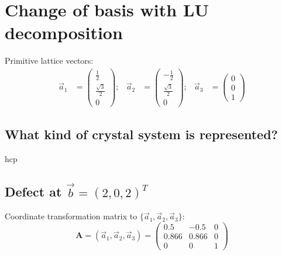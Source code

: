 \section{Change of basis with LU decomposition}

Primitive lattice vectors:
\begin{align}
    \vec{a}_1 &= 
    \begin{pmatrix}
        \frac{1}{2} \\[2pt] \frac{\sqrt{3}}{2} \\[2pt] 0
    \end{pmatrix};
    &
    \vec{a}_2 &=
    \begin{pmatrix}
        -\frac{1}{2} \\[2pt] \frac{\sqrt{3}}{2} \\[2pt] 0
    \end{pmatrix};
    &
    \vec{a}_3 &=
    \begin{pmatrix}
        0 \\
        0 \\
        1
    \end{pmatrix}
\end{align}

\renewcommand\thesubsection{\thesection.\alph{subsection})}

\subsection{What kind of crystal system is represented?}

hcp

\subsection{Defect at $\vec{b} = (2,0,2)^T$}

Coordinate transformation matrix to $\{\vec{a}_1,\vec{a}_2,\vec{a}_3\}$:
\begin{equation}
    \symbf{A} = (\vec{a}_1,\vec{a}_2,\vec{a}_3) =
    \begin{pmatrix}
        0.5 & -0.5 & 0 \\
        0.866 & 0.866 & 0 \\
        0 & 0 & 1
    \end{pmatrix}
\end{equation}

